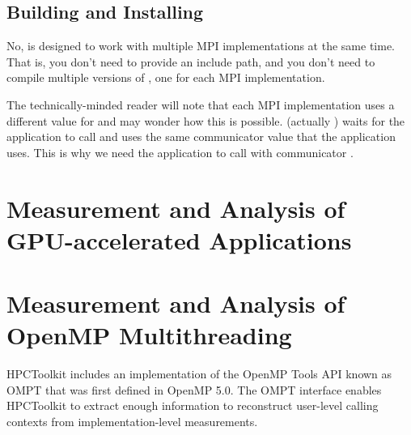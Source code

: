 \documentclass[11pt,twoside,letterpaper]{report}
\begin{document}

\section{Building and Installing \HPCToolkit{}}


\answer{}
No, \HPCToolkit{} is designed to work with multiple MPI implementations at the same time.
That is, you don't need to provide an  include path, and you don't need to compile multiple versions of \HPCToolkit{}, one for each MPI implementation.

The technically-minded reader will note that each MPI implementation uses a different value for  and may wonder how this is possible.
\hpcrun{} (actually ) waits for the application to call  and uses the same communicator value that the application uses.
This is why we need the application to call  with communicator .



\cleardoublepage
\chapter{Measurement and Analysis of GPU-accelerated Applications}
\label{chpt:gpu}





\cleardoublepage
\chapter{Measurement and Analysis of OpenMP Multithreading}
\label{chpt:openmp}

HPCToolkit includes an implementation of the OpenMP Tools API
known as OMPT that was first defined in OpenMP 5.0. The OMPT interface enables HPCToolkit to extract
enough information to reconstruct user-level calling contexts from
implementation-level measurements.
\end{document}
